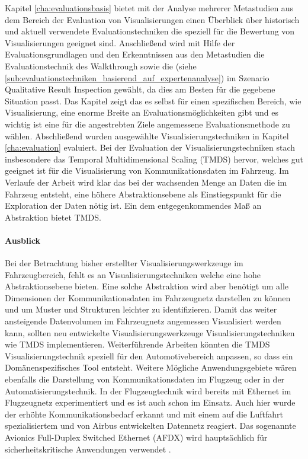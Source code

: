 \documentclass[draft=false
              ,paper=a4
              ,twoside=false
              ,fontsize=11pt
              ,headsepline
              ,BCOR10mm
              ,DIV11
              ]{scrbook}
\begin{document}
Kapitel \ref{cha:evaluationsbasis} bietet mit der Analyse mehrerer Metastudien aus dem Bereich der Evaluation von Visualisierungen einen Überblick über historisch und aktuell verwendete Evaluationstechniken die speziell für die Bewertung von Visualisierungen geeignet sind. Anschließend wird mit Hilfe der Evaluationsgrundlagen und den Erkenntnissen aus den Metastudien die Evaluationstechnik des Walkthrough sowie die  (siehe \ref{sub:evaluationstechniken_basierend_auf_expertenanalyse}) im Szenario Qualitative Result Inspection gewählt, da dies am Besten für die gegebene Situation passt. Das Kapitel zeigt das es selbst für einen spezifischen Bereich, wie Visualisierung, eine enorme Breite an Evaluationsmöglichkeiten gibt und es wichtig ist eine für die angestrebten Ziele angemessene Evaluationsmethode zu wählen. 
Abschließend wurden ausgewählte Visualisierungstechniken in Kapitel \ref{cha:evaluation} evaluiert. Bei der Evaluation der Visualisierungstechniken stach insbesondere das Temporal Multidimensional Scaling (TMDS) hervor, welches gut geeignet ist für die Visualisierung von Kommunikationsdaten im Fahrzeug. Im Verlaufe der Arbeit wird klar das bei der wachsenden Menge an Daten die im Fahrzeug entsteht, eine höhere Abstraktionsebene als Einstiegspunkt für die Exploration der Daten nötig ist. Ein dem entgegenkommendes Maß an Abstraktion bietet TMDS. 

\paragraph{Ausblick} %
\label{par:ausblick}
Bei der Betrachtung bisher erstellter Visualisierungswerkzeuge im Fahrzeugbereich, fehlt es an Visualisierungstechniken welche eine hohe Abstraktionsebene bieten. Eine solche Abstraktion wird aber benötigt um alle Dimensionen der Kommunikationsdaten im Fahrzeugnetz darstellen zu können und um Muster und Strukturen leichter zu identifizieren. Damit das weiter ansteigende Datenvolumen im Fahrzeugnetz angemessen Visualisiert werden kann, sollten neu entwickelte Visualisierungswerkzeuge Visualisierungstechniken wie TMDS implementieren.
Weiterführende Arbeiten könnten die TMDS Visualisierungstechnik speziell für den Automotivebereich anpassen, so dass ein Domänenspezifisches Tool entsteht. Weitere Mögliche Anwendungsgebiete wären ebenfalls die Darstellung von Kommunikationsdaten im Flugzeug oder in der Automatisierungstechnik.  In der Flugzeugtechnik wird bereits mit Ethernet im Flugzeugnetz experimentiert und es ist auch schon im Einsatz. Auch hier wurde der erhöhte Kommunikationsbedarf erkannt und mit einem auf die Luftfahrt spezialisiertem und von Airbus entwickelten Datennetz reagiert. Das sogenannte Avionics Full-Duplex Switched Ethernet (AFDX) wird hauptsächlich für sicherheitskritische Anwendungen verwendet \cite{steiner_recent_2014}. 
\end{document}
